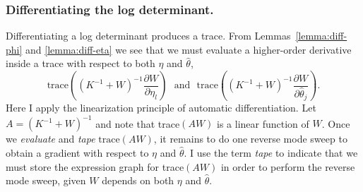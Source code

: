 \documentclass[stslayout, noinfoline]{imsart}
\theoremstyle{definition}
\begin{document}
\subsubsection{Differentiating the log determinant.}

Differentiating a log determinant produces a trace.
From Lemmas~\ref{lemma:diff-phi} and \ref{lemma:diff-eta} we see that we must evaluate a higher-order derivative inside a trace with respect to both $\eta$ and $\hat \theta$,
\begin{equation*}
  \text{trace} \left ( (K^{-1} + W)^{-1} \frac{\partial W}{\partial \eta_l} \right)
  \ \ \ \text{and} \ \ \ \text{trace} \left ( (K^{-1} + W)^{-1} \frac{\partial W}{\partial \hat \theta_j} \right).
\end{equation*}
%
Here I apply the linearization principle of automatic differentiation.
Let $A = (K^{-1} + W)^{-1}$ and note that trace$(AW)$ is a linear function of $W$.
Once we \textit{evaluate} and \textit{tape} $\text{trace}(AW)$,
it remains to do one reverse mode sweep to obtain a gradient with respect to $\eta$ and $\hat \theta$.
I use the term \textit{tape} to indicate that we must store the expression graph for trace$(AW)$ in order to perform the reverse mode sweep, given $W$ depends on both $\eta$ and $\hat \theta$.
\end{document}
